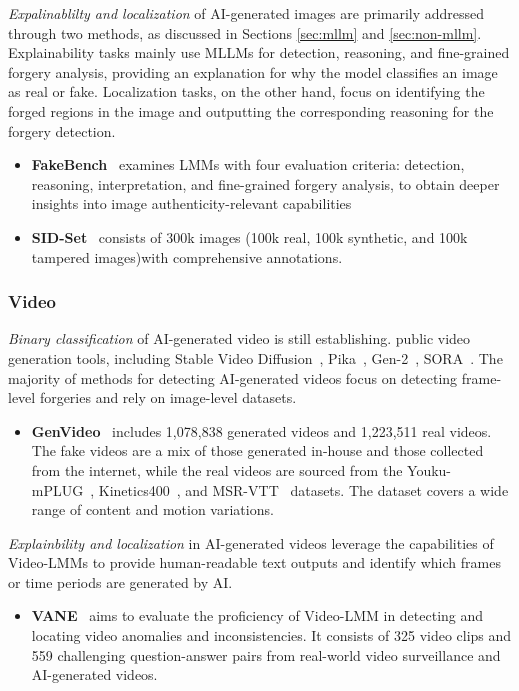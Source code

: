    
\textit{Expalinablilty and localization} of AI-generated images are primarily addressed through two methods, as discussed in Sections \ref{sec:mllm} and \ref{sec:non-mllm}. Explainability tasks mainly use MLLMs for detection, reasoning, and fine-grained forgery analysis, providing an explanation for why the model classifies an image as real or fake. Localization tasks, on the other hand, focus on identifying the forged regions in the image and outputting the corresponding reasoning for the forgery detection.
\begin{itemize}
    \item \textbf{FakeBench}~\cite{li2024fakebench} examines LMMs with four evaluation criteria: detection, reasoning, interpretation, and fine-grained forgery analysis, to obtain deeper insights into image authenticity-relevant capabilities
    \item \textbf{SID-Set}~\cite{huang2024sida} 
    consists of 300k images (100k real, 100k synthetic, and 100k tampered images)with comprehensive annotations.
    
\end{itemize}


\subsubsection{\textbf{Video}}
\textit{Binary classification} of AI-generated video is still establishing. public video generation tools, including Stable Video Diffusion~\cite{ho2022video}, Pika~\cite{Pikalabs2024}, Gen-2~\cite{gen22024}, SORA~\cite{brooks2024video}. The majority of methods for detecting AI-generated videos focus on detecting frame-level forgeries and rely on image-level datasets.

\begin{itemize}
\item \textbf{GenVideo}~\cite{chen2024demamba} includes 1,078,838 generated videos and 1,223,511 real videos. The fake videos are a mix of those generated in-house and those collected from the internet, while the real videos are sourced from the Youku-mPLUG~\cite{xu2023youku}, Kinetics400~\cite{kay2017kinetics}, and MSR-VTT~\cite{xu2016msr} datasets. The dataset covers a wide range of content and motion variations.
\end{itemize}


\textit{Explainbility and localization} in AI-generated videos leverage the capabilities of Video-LMMs to provide human-readable text outputs and identify which frames or time periods are generated by AI.
\begin{itemize}

    \item \textbf{VANE}~\cite{bharadwaj2024vane} aims to evaluate the proficiency of Video-LMM in detecting and locating video anomalies and inconsistencies. It consists of 325 video clips and 559 challenging question-answer pairs from real-world video surveillance and AI-generated videos.
\end{itemize}

